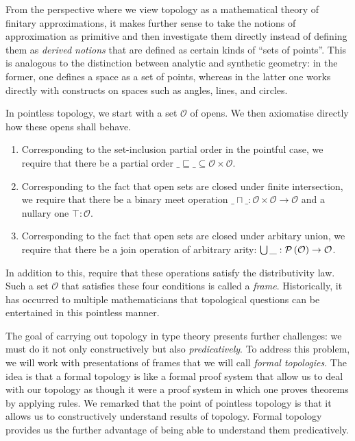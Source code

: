 From the perspective where we view topology as a mathematical theory of finitary
approximations, it makes further sense to take the notions of approximation as primitive
and then investigate them directly instead of defining them as \emph{derived notions} that
are defined as certain kinds of ``sets of points''. This is analogous to the distinction
between analytic and synthetic geometry: in the former, one defines a space as a set of
points, whereas in the latter one works directly with constructs on spaces such as angles,
lines, and circles.

In pointless topology, we start with a set $\mathcal{O}$ of opens. We then axiomatise
directly how these opens shall behave.
\begin{enumerate}
  \item Corresponding to the set-inclusion partial order in the pointful case, we require that
    there be a partial order $\_\sqsubseteq\_ \subseteq \mathcal{O} \times \mathcal{O}$.
  \item Corresponding to the fact that open sets are closed under finite intersection, we require
    that there be a binary meet operation $\_\sqcap\_ : \mathcal{O} \times \mathcal{O} \rightarrow \mathcal{O}$ and a
    nullary one $\top : \mathcal{O}$.
  \item Corresponding to the fact that open sets are closed under arbitary union, we require that
    there be a join operation of arbitrary arity: $\bigcup\_ : \mathcal{P}\left(\mathcal{O}\right) \rightarrow \mathcal{O}$.
\end{enumerate}
In addition to this, require that these operations satisfy the distributivity law.
Such a set $\mathcal{O}$ that satisfies these four conditions is called a \emph{frame}.
Historically, it has occurred to multiple mathematicians that topological questions can
be entertained in this pointless manner.

The goal of carrying out topology in type theory presents further challenges: we must do
it not only constructively but also \emph{predicatively}. To address this problem, we will
work with presentations of frames that we will call \emph{formal topologies}. The idea is
that a formal topology is like a formal proof system that allow us to deal with our
topology as though it were a proof system in which one proves theorems by applying rules.
We remarked that the point of pointless topology is that it allows us to constructively
understand results of topology. Formal topology provides us the further advantage of
being able to understand them predicatively.

